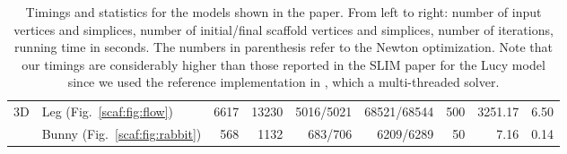 \begin{table}[t]
\begin{adjustbox}{width=\columnwidth,totalheight=\textheight,keepaspectratio}
\begin{tabular}{llrrrrrrr}
\multirow{2}{*}{3D}&Leg (Fig.~\ref{scaf:fig:flow})
&6617&13230&5016/5021&68521/68544&500&3251.17&6.50\\
&Bunny (Fig.~\ref{scaf:fig:rabbit})
&568&1132&683/706&6209/6289&50&7.16&0.14\\

\hline
	\end{tabular}
	\end{adjustbox}
			\caption{Timings and statistics for the models shown in the paper. From left to right: number of input vertices and simplices, number of initial/final scaffold vertices and simplices, number of iterations, running time in seconds. The numbers in parenthesis refer to the Newton optimization. Note that our timings are considerably higher than those reported in the SLIM paper for the Lucy model since we used the reference implementation in \protect\cite{libigl}, which  a multi-threaded solver.}
	\label{tab:timings}
	\vspace{-0.2cm}
\end{table}
